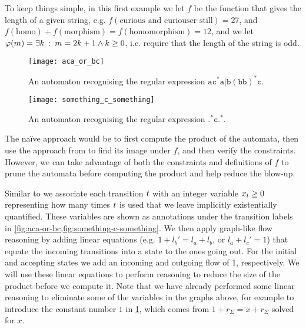 \documentclass[acmsmall,review,anonymous,screen]{acmart}\settopmatter{printfolios=true,printccs=false,printacmref=true}
\theoremstyle{definition}
\begin{document}
To keep things simple, in this first example we let $f$ be the function that
gives the length of a given string, e.g. $f\left(\text{curious and curiouser
still}\right) = 27$, and $f\left(\text{homo}\right) +
f\left(\text{morphism}\right) = f\left(\text{homomorphism}\right) = 12$, and we
let $\varphi(m) = \exists k \::\: m = 2k + 1 \land k \geq 0$,
i.e. require that the length of the string is odd.

\begin{figure}[t]
  \begin{minipage}[b]{0.70\linewidth}
  \centering 
  \texttt{[image: aca\_or\_bc]}
  \caption{An automaton recognising the regular expression
    $\mathtt{ac^*a|b(bb)^*c}$. }\label{fig:aca-or-bc}

    \texttt{[image: something\_c\_something]}
    \caption{An automaton recognising the regular expression
    $\mathtt{.^*c.^*}$.}\label{fig:something-c-something}
  \end{minipage}
  \end{figure}

The na\"ive approach would be to first compute the product of the automata, then
use the approach from \cite{generate-parikh-image} to find its image under $f$,
and then verify the constraints. However, we can take advantage of both the
constraints and definitions of $f$ to prune the automata before computing the
product and help reduce the blow-up.

Similar to \cite{generate-parikh-image} we associate each transition
$t$ with an integer variable $x_t \geq 0$
representing how many times $t$ is used that we leave implicitly
existentially quantified. These variables are shown as annotations under the
transition labels in \cref{fig:aca-or-bc,fig:something-c-something}. We then
apply graph-like flow reasoning by adding linear equations (e.g. $1 + {l_b}' =
l_a + l_b$, or $l_a + l_c' = 1$) that equate the incoming transitions into a
state to the ones going out. For the initial and accepting states we add an
incoming and outgoing flow of 1, respectively. We will use these linear
equations to perform reasoning to reduce the size of the product before we
compute it. Note that we have already performed some linear reasoning to
eliminate some of the variables in the graphs above, for example to introduce
the constant number $1$ in \cref{fig:something-c-something}, which comes from $1
+ r_\Sigma = x + r_\Sigma$ solved for $x$.
\end{document}
